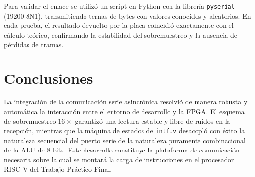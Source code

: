 \documentclass[10.5pt,a4paper]{article}
\begin{document}
Para validar el enlace se utilizó un script en Python con la librería \texttt{pyserial} (19200-8N1), transmitiendo ternas de bytes con valores conocidos y aleatorios. En cada prueba, el resultado devuelto por la placa coincidió exactamente con el cálculo teórico, confirmando la estabilidad del sobremuestreo y la ausencia de pérdidas de tramas.

\section{Conclusiones}
La integración de la comunicación serie asincrónica resolvió de manera robusta y automática la interacción entre el entorno de desarrollo y la FPGA. El esquema de sobremuestreo $16\times$ garantizó una lectura estable y libre de ruidos en la recepción, mientras que la máquina de estados de \texttt{intf.v} desacopló con éxito la naturaleza secuencial del puerto serie de la naturaleza puramente combinacional de la ALU de 8 bits. Este desarrollo constituye la plataforma de comunicación necesaria sobre la cual se montará la carga de instrucciones en el procesador RISC-V del Trabajo Práctico Final.
\end{document}
